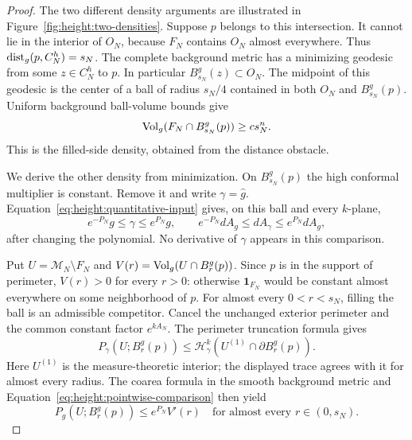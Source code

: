 \begin{proof}
The two different density arguments are illustrated in
Figure~\ref{fig:height:two-densities}.  Suppose $p$ belongs to this
intersection.  It cannot lie in the
interior of $O_N$, because $F_N$ contains $O_N$ almost everywhere.
Thus $\operatorname{dist}_g(p,C_N^h)=s_N$.  The complete background metric has a
minimizing geodesic from some $z\in C_N^h$ to $p$.  In particular
$B^g_{s_N}(z)\subset O_N$.  The midpoint of this geodesic is the
center of a ball of radius $s_N/4$ contained in both $O_N$ and
$B^g_{s_N}(p)$.  Uniform background ball-volume bounds give
\begin{equation}\label{eq:height:filled-density}
 \operatorname{Vol}_g(F_N\cap B^g_{s_N}(p))\ge c s_N^n.
\end{equation}
This is the filled-side density, obtained from the distance obstacle.

We derive the other density from minimization.  On $B^g_{s_N}(p)$
the high conformal multiplier is constant.  Remove it and write
$\gamma=\widehat g$.  Equation~\eqref{eq:height:quantitative-input}
gives, on this ball and every $k$-plane,
\begin{equation}\label{eq:height:pointwise-comparison}
 e^{-P_N}g\le\gamma\le e^{P_N}g,
 \qquad e^{-P_N}dA_g\le dA_\gamma\le e^{P_N}dA_g,
\end{equation}
after changing the polynomial.  No derivative of $\gamma$ appears
in this comparison.

Put $U=\mathcal M_N\setminus F_N$ and
$V(r)=\operatorname{Vol}_g(U\cap B^g_r(p))$.  Since $p$ is in the support of
perimeter, $V(r)>0$ for every $r>0$: otherwise $\mathbf1_{F_N}$
would be constant almost everywhere on some neighborhood of $p$.
For almost every $0<r<s_N$, filling the ball is an admissible
competitor.  Cancel the unchanged exterior perimeter and the common
constant factor $e^{kA_N}$.  The perimeter truncation formula gives
\[
 P_\gamma(U;B^g_r(p))
 \le\mathcal H^k_\gamma(U^{(1)}\cap\partial B^g_r(p)).
\]
Here $U^{(1)}$ is the measure-theoretic interior; the displayed trace
agrees with it for almost every radius.  The coarea formula in the
smooth background metric and Equation~\eqref{eq:height:pointwise-comparison}
then yield
\begin{equation}\label{eq:height:one-sided-perimeter}
 P_g(U;B^g_r(p))\le e^{P_N}V'(r)
 \quad\text{for almost every }r\in(0,s_N).
\end{equation}


\end{proof}
